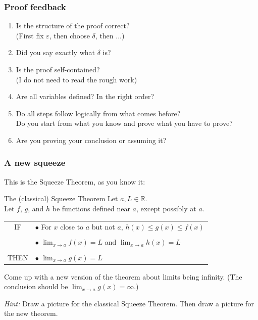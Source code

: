 \begin{frame}[t]
	\frametitle{Proof feedback}

	\begin{enumerate}
		\item Is the structure of the proof correct? \\ (First fix $\varepsilon$,
			then choose $\delta$, then ...)

		\item Did you say exactly what $\delta$ is?

		\item Is the proof self-contained? \\ (I do not need to read the rough work)

		\item Are all variables defined? In the right order?

		\item Do all steps follow logically from what comes before? \\ Do you start
			from what you know and prove what you have to prove? \\

		\item Are you proving your conclusion or assuming it?
	\end{enumerate}
\end{frame}

\begin{frame}[t]
	\frametitle{A new squeeze}
	\fontsize{13}{13}\selectfont This is the Squeeze Theorem, as you know it:

	\begin{block}{The (classical) Squeeze Theorem}
		Let $a, L \in \mathbb{R}$. \\ Let $f$, $g$, and $h$ be functions defined
		near $a$, except possibly at $a$.

		\vspace{.2cm}
		\begin{tabular}{cl}
			IF             & $\bullet$ {For $x$ close to $a$ but not $a$,} \; $\displaystyle h(x) \leq g(x) \leq f(x)$              \\
			\vspace{-0.2cm} \\
			               & $\bullet$ $\displaystyle \lim_{x \to a}f(x) = L$ \quad and \quad$\displaystyle \lim_{x \to a}h(x) = L$ \\
			\vspace{-.1cm}  \\
			THEN           & $\bullet$ $\displaystyle \lim_{x \to a}g(x) = L$
		\end{tabular}
	\end{block}

	Come up with a new version of the theorem about limits being infinity. (The
	conclusion should be $\displaystyle \lim_{x \to a}g(x) = \infty$.)

	\emph{Hint:} Draw a picture for the classical Squeeze Theorem. Then draw a picture
	for the new theorem.
\end{frame}

